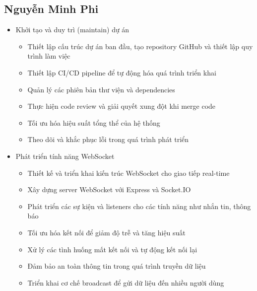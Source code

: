 \subsection{Nguyễn Minh Phi}
\begin{itemize}
    \item Khởi tạo và duy trì (maintain) dự án
    \begin{itemize}
        \item Thiết lập cấu trúc dự án ban đầu, tạo repository GitHub và thiết lập quy trình làm việc
        \item Thiết lập CI/CD pipeline để tự động hóa quá trình triển khai
        \item Quản lý các phiên bản thư viện và dependencies
        \item Thực hiện code review và giải quyết xung đột khi merge code
        \item Tối ưu hóa hiệu suất tổng thể của hệ thống
        \item Theo dõi và khắc phục lỗi trong quá trình phát triển
    \end{itemize}
    
    \item Phát triển tính năng WebSocket
    \begin{itemize}
        \item Thiết kế và triển khai kiến trúc WebSocket cho giao tiếp real-time
        \item Xây dựng server WebSocket với Express và Socket.IO
        \item Phát triển các sự kiện và listeners cho các tính năng như nhắn tin, thông báo
        \item Tối ưu hóa kết nối để giảm độ trễ và tăng hiệu suất
        \item Xử lý các tình huống mất kết nối và tự động kết nối lại
        \item Đảm bảo an toàn thông tin trong quá trình truyền dữ liệu
        \item Triển khai cơ chế broadcast để gửi dữ liệu đến nhiều người dùng
    \end{itemize}
    

\end{itemize}
